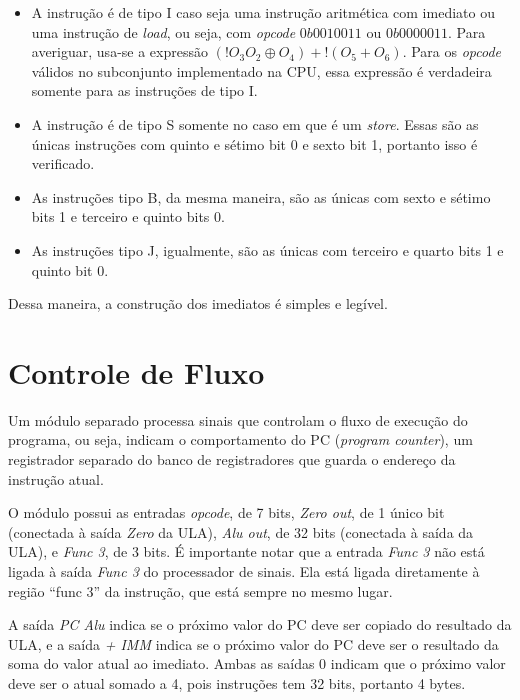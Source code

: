 \documentclass[twocolumn]{article}
\newcommand{\circuit}[1]{}
\begin{document}
\begin{itemize}
\item A instrução é de tipo I caso seja uma instrução aritmética com imediato ou
  uma instrução de \textit{load}, ou seja, com \textit{opcode} $0b0010011$ ou
  $0b0000011$. Para averiguar, usa-se a expressão
  $(!O_3 O_2 \oplus  O_4) + !(O_5 + O_6)$.
  Para os \textit{opcode} válidos no subconjunto implementado na CPU, essa
  expressão é verdadeira somente para as instruções de tipo I.
\item A instrução é de tipo S somente no caso em que é um \textit{store}. Essas
  são as únicas instruções com quinto e sétimo bit 0 e sexto bit 1, portanto
  isso é verificado.
\item As instruções tipo B, da mesma maneira, são as únicas com sexto e sétimo
  bits 1 e terceiro e quinto bits 0.
\item As instruções tipo J, igualmente, são as únicas com terceiro e quarto bits
  1 e quinto bit 0.
\end{itemize}

Dessa maneira, a construção dos imediatos é simples e legível.

\section{Controle de Fluxo}

Um módulo separado processa sinais que controlam o fluxo de execução do
programa, ou seja, indicam o comportamento do PC (\textit{program counter}), um
registrador separado do banco de registradores que guarda o endereço da
instrução atual.

\circuit{pc-signal}

O módulo possui as entradas \textit{opcode}, de 7 bits, \textit{Zero out}, de 1
único bit (conectada à saída \textit{Zero} da ULA), \textit{Alu out}, de 32 bits
(conectada à saída da ULA), e \textit{Func 3}, de 3 bits. É importante notar que
a entrada \textit{Func 3} não está ligada à saída \textit{Func 3} do processador
de sinais. Ela está ligada diretamente à região ``func 3'' da instrução, que
está sempre no mesmo lugar.

A saída \textit{PC Alu} indica se o próximo valor do PC deve ser copiado do
resultado da ULA, e a saída \textit{+ IMM} indica se o próximo valor do PC deve
ser o resultado da soma do valor atual ao imediato. Ambas as saídas 0 indicam
que o próximo valor deve ser o atual somado a 4, pois instruções tem 32 bits,
portanto 4 bytes.
\end{document}
